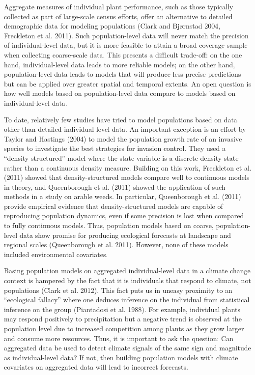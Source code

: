 \documentclass[12pt,]{article}
\begin{document}
Aggregate measures of individual plant performance, such as those
typically collected as part of large-scale census efforts, offer an
alternative to detailed demographic data for modeling populations (Clark
and Bjørnstad 2004, Freckleton et al. 2011). Such population-level data
will never match the precision of individual-level data, but it is more
feasible to attain a broad coverage sample when collecting coarse-scale
data. This presents a difficult trade-off: on the one hand,
individual-level data leads to more reliable models; on the other hand,
population-level data leads to models that will produce less precise
predictions but can be applied over greater spatial and temporal
extents. An open question is how well models based on population-level
data compare to models based on individual-level data.

To date, relatively few studies have tried to model populations based on
data other than detailed individual-level data. An important exception
is an effort by Taylor and Hastings (2004) to model the population
growth rate of an invasive species to investigate the best strategies
for invasion control. They used a ``density-structured'' model where the
state variable is a discrete density state rather than a continuous
density measure. Building on this work, Freckleton et al. (2011) showed
that density-structured models compare well to continuous models in
theory, and Queenborough et al. (2011) showed the application of such
methods in a study on arable weeds. In particular, Queenborough et al.
(2011) provide empirical evidence that density-structured models are
capable of reproducing population dynamics, even if some precision is
lost when compared to fully continuous models. Thus, population models
based on coarse, population-level data show promise for producing
ecological forecasts at landscape and regional scales (Queenborough et
al. 2011). However, none of these models included environmental
covariates.

Basing population models on aggregated individual-level data in a
climate change context is hampered by the fact that it is individuals
that respond to climate, not populations (Clark et al. 2012). This fact
puts us in uneasy proximity to an ``ecological fallacy'' where one
deduces inference on the individual from statistical inference on the
group (Piantadosi et al. 1988). For example, individual plants may
respond positively to precipitation but a negative trend is observed at
the population level due to increased competition among plants as they
grow larger and consume more resources. Thus, it is important to ask the
question: Can aggregated data be used to detect climate signals of the
same sign and magnitude as individual-level data? If not, then building
population models with climate covariates on aggregated data will lead
to incorrect forecasts.
\end{document}
